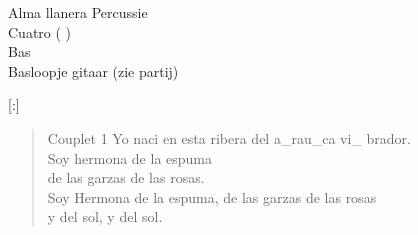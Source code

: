 \begin{song}[joropo]{Alma llanera}
Percussie\\
Cuatro ( )\\
Bas\\
Basloopje gitaar (zie partij)\\

\begin{instrumental}{}
   \measure{}[:]  \measure{}  \measure{} 
\end{instrumental}

\begin{verse}{Couplet 1}
Yo naci en esta ribera del a\_rau\_ca vi\_  brador. \hspace{1em}  \hspace{1em}  \hspace{1em}\\
  Soy hermona de la espuma  \hspace{1em} \hspace{1em}  \hspace{1em}\\
  de las garzas de las rosas.  \hspace{1em} \hspace{1em}  \hspace{1em}\\
  Soy Hermona de la espuma, de las garzas de las rosas\\
y del sol, y del sol.   \hspace{2em}\\
\end{verse}


\end{song}
